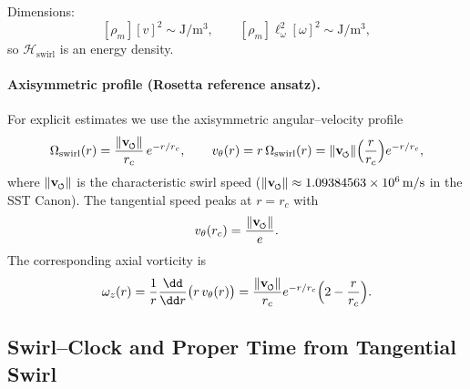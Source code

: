 \documentclass[11pt]{article}
\newcommand{\vnorm}{\lVert \mathbf{v}_{\mkern-2mu\scriptscriptstyle\boldsymbol{\circlearrowleft}} \rVert}               %
\newcommand{\rhoM}{\rho_{\!m}}   %
\newcommand{\rc}{r_c}                                    %
\begin{document}
            Dimensions:
            \[
                [\rhoM][v]^2 \sim \mathrm{J/m^3},
                \qquad
                [\rhoM]\ell_\omega^{2}[\omega]^{2}
                \sim \mathrm{J/m^3},
            \]
            so \(\mathcal{H}_{\text{swirl}}\) is an energy density.

            \paragraph{Axisymmetric profile (Rosetta reference ansatz).}

                For explicit estimates we use the axisymmetric angular–velocity profile
                \begin{equation}
                    \Omega_{\text{swirl}}(r)
                    =
                    \frac{\vnorm}{\rc}\,e^{-r/\rc},
                    \qquad
                    v_\theta(r)
                    =
                    r\,\Omega_{\text{swirl}}(r)
                    =
                    \vnorm\Big(\frac{r}{\rc}\Big)e^{-r/\rc},
                    \label{eq:sst_omegaswirl_profile}
                \end{equation}
                where \(\vnorm\) is the characteristic swirl speed (\(\vnorm \approx 1.09384563\times10^{6}\,\mathrm{m/s}\) in the SST Canon). The tangential speed peaks at \(r=\rc\) with
                \begin{equation}
                    v_\theta(\rc)=\frac{\vnorm}{e}.
                \end{equation}
                The corresponding axial vorticity is
                \begin{equation}
                    \omega_z(r)
                    =
                    \frac{1}{r}\frac{\dd}{\dd r}\big(r\,v_\theta(r)\big)
                    =
                    \frac{\vnorm}{\rc}e^{-r/\rc}\Big(2-\frac{r}{\rc}\Big).
                    \label{eq:sst_omega_z_exact}
                \end{equation}

    \subsection{Swirl–Clock and Proper Time from Tangential Swirl}
        \label{subsec:sst_proper_time}
\end{document}
